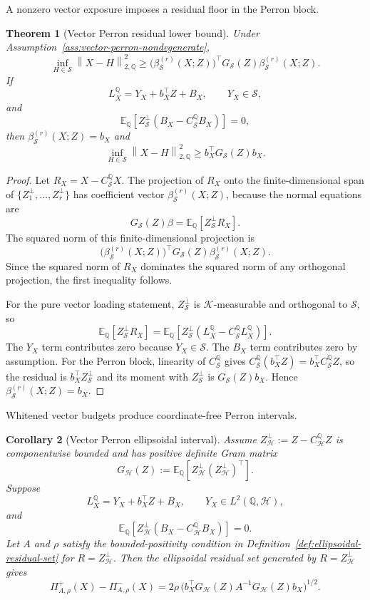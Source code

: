 \documentclass[11pt,a4paper]{amsart}
\theoremstyle{plain}
\newtheorem{theorem}{Theorem}[section]
\newtheorem{corollary}[theorem]{Corollary}
\theoremstyle{definition}
\theoremstyle{remark}
\newcommand{\QQ}{\mathbb{Q}}
\newcommand{\EE}{\mathbb{E}}
\newcommand{\cH}{\mathcal{H}}
\newcommand{\cK}{\mathcal{K}}
\newcommand{\cS}{\mathcal{S}}
\newcommand{\norm}[1]{\left\lVert #1\right\rVert}
\begin{document}
A nonzero vector exposure imposes a residual floor in the Perron block.

\begin{theorem}[Vector Perron residual lower bound]\label{thm:vector-perron-bound}
Under Assumption~\ref{ass:vector-perron-nondegenerate},
\[
        \inf_{H\in\cS}\norm{X-H}_{2,\QQ}^{2}
        \ge
        \bigl(\beta_{\cS}^{(r)}(X;Z)\bigr)^\top
        G_{\cS}(Z)
        \beta_{\cS}^{(r)}(X;Z).
\]
If
\[
        L_X^\QQ=Y_X+b_X^\top Z+B_X,\qquad Y_X\in\cS,
\]
and
\[
        \EE_\QQ[Z_{\cS}^{\perp}(B_X-C_{\cS}^{\QQ}B_X)]=0,
\]
then \(\beta_{\cS}^{(r)}(X;Z)=b_X\) and
\[
        \inf_{H\in\cS}\norm{X-H}_{2,\QQ}^{2}
        \ge
        b_X^\top G_{\cS}(Z)b_X.
\]
\end{theorem}

\begin{proof}
Let \(R_X=X-C_{\cS}^{\QQ}X\).  The projection of \(R_X\) onto the finite-dimensional span of
\(\{Z_1^{\perp},\ldots,Z_r^{\perp}\}\) has coefficient vector
\(\beta_{\cS}^{(r)}(X;Z)\), because the normal equations are
\[
        G_{\cS}(Z)\beta
        =
        \EE_\QQ[Z_{\cS}^{\perp}R_X].
\]
The squared norm of this finite-dimensional projection is
\[
        \bigl(\beta_{\cS}^{(r)}(X;Z)\bigr)^\top G_{\cS}(Z)\beta_{\cS}^{(r)}(X;Z).
\]
Since the squared norm of \(R_X\) dominates the squared norm of any orthogonal projection, the first
inequality follows.

For the pure vector loading statement, \(Z_{\cS}^{\perp}\) is \(\cK\)-measurable and orthogonal to
\(\cS\), so
\[
        \EE_\QQ[Z_{\cS}^{\perp}R_X]
        =
        \EE_\QQ[Z_{\cS}^{\perp}(L_X^\QQ-C_{\cS}^{\QQ}L_X^\QQ)].
\]
The \(Y_X\) term contributes zero because \(Y_X\in\cS\).  The \(B_X\) term contributes zero by
assumption.  For the Perron block, linearity of \(C_{\cS}^{\QQ}\) gives
\(C_{\cS}^{\QQ}(b_X^\top Z)=b_X^\top C_{\cS}^{\QQ}Z\), so the residual is
\(b_X^\top Z_{\cS}^{\perp}\) and its moment with \(Z_{\cS}^{\perp}\) is
\(G_{\cS}(Z)b_X\).  Hence \(\beta_{\cS}^{(r)}(X;Z)=b_X\).
\end{proof}

Whitened vector budgets produce coordinate-free Perron intervals.

\begin{corollary}[Vector Perron ellipsoidal interval]\label{cor:vector-perron-interval}
Assume \(Z_{\cH}^{\perp}:=Z-C_{\cH}^{\QQ}Z\) is componentwise bounded and has positive definite
Gram matrix
\[
        G_{\cH}(Z):=\EE_\QQ[Z_{\cH}^{\perp}(Z_{\cH}^{\perp})^\top].
\]
Suppose
\[
        L_X^\QQ=Y_X+b_X^\top Z+B_X,\qquad Y_X\in L^2(\QQ,\cH),
\]
and
\[
        \EE_\QQ[Z_{\cH}^{\perp}(B_X-C_{\cH}^{\QQ}B_X)]=0.
\]
Let \(A\) and \(\rho\) satisfy the bounded-positivity condition in
Definition~\ref{def:ellipsoidal-residual-set} for \(R=Z_{\cH}^{\perp}\).  Then the ellipsoidal
residual set generated by \(R=Z_{\cH}^{\perp}\) gives
\[
        \Pi^+_{A,\rho}(X)-\Pi^-_{A,\rho}(X)
        =
        2\rho\,
        \bigl(b_X^\top G_{\cH}(Z)A^{-1}G_{\cH}(Z)b_X\bigr)^{1/2}.
\]
\end{corollary}
\end{document}
